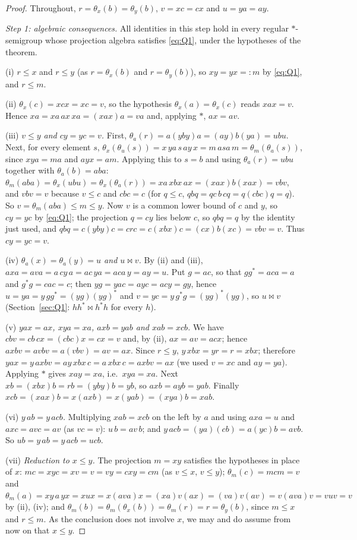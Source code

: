 \documentclass[11pt]{amsart}
\theoremstyle{definition}
\begin{document}
\begin{proof}
Throughout, $r=\theta_x(b)=\theta_y(b)$, $v=xc=cx$ and $u=ya=ay$.

\smallskip
\emph{Step 1: algebraic consequences.} All identities in this step hold in every regular $*$-semigroup whose projection algebra satisfies \eqref{eq:Q1}, under the hypotheses of the theorem.

(i) $r\le x$ and $r\le y$ (as $r=\theta_x(b)$ and $r=\theta_y(b)$), so $xy=yx=:m$ by \eqref{eq:Q1}, and $r\le m$.

(ii) $\theta_x(c)=xcx=xc=v$, so the hypothesis $\theta_x(a)=\theta_x(c)$ reads $xax=v$. Hence $xa=xa\,ax\,xa=(xax)a=va$ and, applying $*$, $ax=av$.

(iii) \emph{$v\le y$ and $cy=yc=v$.} First, $\theta_a(r)=a(yby)a=(ay)b(ya)=ubu$. Next, for every element $s$, $\theta_x(\theta_u(s))=x\,ya\,s\,ay\,x=m\,a s a\,m=\theta_m(\theta_a(s))$, since $xya=ma$ and $ayx=am$. Applying this to $s=b$ and using $\theta_a(r)=ubu$ together with $\theta_a(b)=aba$: $\theta_m(aba)=\theta_x(ubu)=\theta_x(\theta_a(r))=xa\,xbx\,ax=(xax)b(xax)=vbv$, and $vbv=v$ because $v\le c$ and $cbc=c$ (for $q\le c$, $qbq=qc\,b\,cq=q(cbc)q=q$). So $v=\theta_m(aba)\le m\le y$. Now $v$ is a common lower bound of $c$ and $y$, so $cy=yc$ by \eqref{eq:Q1}; the projection $q=cy$ lies below $c$, so $qbq=q$ by the identity just used, and $qbq=c(yby)c=crc=c(xbx)c=(cx)b(xc)=vbv=v$. Thus $cy=yc=v$.

(iv) \emph{$\theta_a(x)=\theta_a(y)=u$ and $u\bowtie v$.} By (ii) and (iii), $axa=ava=a\,cy\,a=ac\,ya=aca\,y=ay=u$. Put $g=ac$, so that $gg^*=aca=a$ and $g^*g=cac=c$; then $yg=yac=ayc=acy=gy$, hence $u=ya=y\,gg^*=(yg)(yg)^*$ and $v=yc=y\,g^*g=(yg)^*(yg)$, so $u\bowtie v$ (Section~\ref{sec:Q1}: $hh^*\bowtie h^*h$ for every $h$).

(v) \emph{$yax=ax$, $xya=xa$, $axb=yab$ and $xab=xcb$.} We have $cbv=cb\,cx=(cbc)x=cx=v$ and, by (ii), $ax=av=acx$; hence $axbv=avbv=a(vbv)=av=ax$. Since $r\le y$, $y\,xbx=yr=r=xbx$; therefore $yax=y\,axbv=ay\,xbx\,c=a\,xbx\,c=axbv=ax$ (we used $v=xc$ and $ay=ya$). Applying $*$ gives $xay=xa$, i.e.\ $xya=xa$. Next $xb=(xbx)b=rb=(yby)b=yb$, so $axb=ayb=yab$. Finally $xcb=(xax)b=x(axb)=x(yab)=(xya)b=xab$.

(vi) \emph{$y\,ab=y\,acb$.} Multiplying $xab=xcb$ on the left by $a$ and using $axa=u$ and $axc=avc=av$ (as $vc=v$): $u\,b=av\,b$; and $y\,acb=(ya)(cb)=a(yc)b=avb$. So $ub=y\,ab=y\,acb=ucb$.

(vii) \emph{Reduction to $x\le y$.} The projection $m=xy$ satisfies the hypotheses in place of $x$: $mc=xyc=xv=v=vy=cxy=cm$ (as $v\le x$, $v\le y$); $\theta_m(c)=mcm=v$ and $\theta_m(a)=xy\,a\,yx=xux=x(ava)x=(xa)v(ax)=(va)v(av)=v(ava)v=vuv=v$ by (ii), (iv); and $\theta_m(b)=\theta_m(\theta_x(b))=\theta_m(r)=r=\theta_y(b)$, since $m\le x$ and $r\le m$. As the conclusion does not involve $x$, we may and do assume from now on that $x\le y$.


\end{proof}
\end{document}
